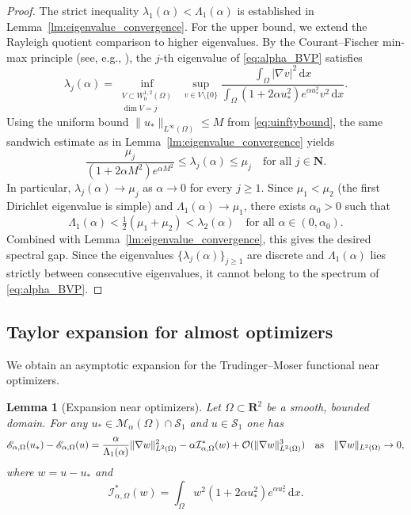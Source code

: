\documentclass[reqno,11pt]{amsart}
\newtheorem{lemma}[theorem]{Lemma}
\theoremstyle{definition}
\newcommand{\ud}{\,\mathrm{d}}
\begin{document}
\begin{proof}
The strict inequality $\lambda_1(\alpha)<\Lambda_1(\alpha)$ is established in Lemma~\ref{lm:eigenvalue_convergence}.
For the upper bound, we extend the Rayleigh quotient comparison to higher eigenvalues.
By the Courant--Fischer min-max principle (see, e.g., \cite[Chapter~VI]{CourantHilbert}), the $j$-th eigenvalue of \eqref{eq:alpha_BVP} satisfies
\[
\lambda_j(\alpha)
=\inf_{\substack{V\subset W^{1,2}_0(\Omega)\\ \dim V=j}}\;
\sup_{v\in V\setminus\{0\}}
\frac{\int_\Omega|\nabla v|^2\ud x}
{\int_\Omega(1+2\alpha u_*^2)e^{\alpha u_*^2}v^2\ud x}.
\]
Using the uniform bound $\|u_*\|_{L^\infty(\Omega)}\le M$ from \eqref{eq:uinftybound}, the same sandwich estimate as in Lemma~\ref{lm:eigenvalue_convergence} yields
\[
\frac{\mu_j}{(1+2\alpha M^2)e^{\alpha M^2}}
\le \lambda_j(\alpha) \le \mu_j
\quad\text{for all }j\in\mathbf{N}.
\]
In particular, $\lambda_j(\alpha)\to\mu_j$ as $\alpha\to0$ for every $j\ge1$.
Since $\mu_1<\mu_2$ (the first Dirichlet eigenvalue is simple) and $\Lambda_1(\alpha)\to\mu_1$, there exists $\alpha_0>0$ such that
\[
\Lambda_1(\alpha)<\tfrac{1}{2}(\mu_1+\mu_2)<\lambda_2(\alpha)
\quad\text{for all }\alpha\in(0,\alpha_0).
\]
Combined with Lemma~\ref{lm:eigenvalue_convergence}, this gives the desired spectral gap.
Since the eigenvalues $\{\lambda_j(\alpha)\}_{j\ge1}$ are discrete and $\Lambda_1(\alpha)$ lies strictly between consecutive eigenvalues, it cannot belong to the spectrum of \eqref{eq:alpha_BVP}.
\end{proof}


\subsection{Taylor expansion for almost optimizers}\label{subsec:taylor_expansion}
We obtain an asymptotic expansion for the Trudinger--Moser functional near optimizers.

\begin{lemma}[Expansion near optimizers]\label{lm:taylor_expansion}
Let $\Omega\subset\mathbf{R}^2$ be a smooth, bounded domain.
For any $u_*\in \mathcal{M}_\alpha(\Omega)\cap \mathcal{S}_1$ and $u\in \mathcal{S}_1$ one has 
\begin{equation} \label{eq:taylor_expansion} 
\mathscr{E}_{\alpha,\Omega} (u_*) - \mathscr{E}_{\alpha,\Omega} (u) 
= \frac{\alpha}{\Lambda_1(\alpha)} 
		\| \nabla w\|_{L^2(\Omega)}^2 - \alpha\mathcal{I}^*_{\alpha,\Omega}(w) 
        + \mathcal{O}(\|\nabla w\|_{L^2(\Omega)}^3) \quad {\rm as} \quad \|\nabla w\|_{L^{2}(\Omega)}\to0,
\end{equation} 
where $w=u-u_*$ and
\begin{equation}\label{eq:integral_error}
  \mathcal{I}^*_{\alpha,\Omega}(w)= \int_\Omega w^2(1+2\alpha u_*^2)
		e^{\alpha u_*^2} \ud x.  
\end{equation}
\end{lemma} 
\end{document}
